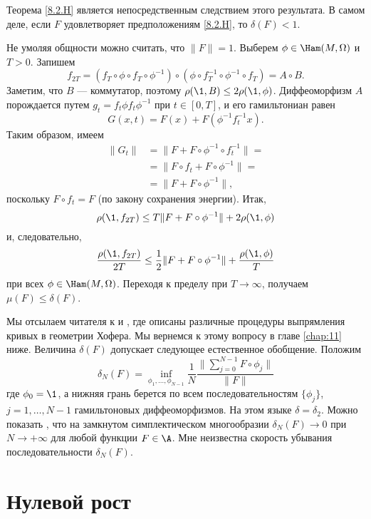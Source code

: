 Теорема \ref{8.2.H} является непосредственным следствием этого
результата. 
В самом деле, если $F$ удовлетворяет предположениям \ref{8.2.H}, то
$\delta (F) <1$. 

Не умоляя общности можно считать, что $\|F \| = 1$.
Выберем $\phi \in \Ham (M, \Omega)$ и $T> 0$.
Запишем 
\[f_{2T}= (f_T \circ \phi \circ f_T \circ \phi^{-1}) \circ (\phi \circ
f_T^{-1} \circ \phi^{-1} \circ f_T) = A \circ B.\] 
Заметим, что $B$ --- коммутатор, поэтому $\rho (\1, B) \le 2\rho (\1, \phi)$.
Диффеоморфизм $A$ порождается путем $g_t = f_t \phi f_t \phi ^{-1}$
при $t \in [0, T]$, и его гамильтониан равен  
\[G (x, t) = F (x) + F (\phi^{-1} f_t^{-1} x).\]
Таким образом, имеем 
\begin{align*}
\|G_t \| &= \|F + F \circ \phi ^{-1} \circ f_t ^{-1} \| =
\\
&=\|F \circ f_t + F \circ \phi ^{-1} \| =
\\
&=\|F + F \circ \phi ^{-1} \|,\end{align*}
поскольку $F \circ f_t = F$ (по закону сохранения энергии).
Итак, 
\[\rho (\1, f_{2T}) \le T \| F + F \circ \phi ^{-1} \| + 2\rho (\1, \phi)\]
и, следовательно, 
\[\frac{\rho (\1, f_{2T})}{2T}
\le\frac12 \|F + F \circ \phi ^{-1} \| + \frac{\rho (\1, \phi)}{T}\]
при всех $\phi \in \Ham (M , \Omega)$.
Переходя к пределу при $T \to \infty$, получаем $\mu (F) \le \delta (F)$.
\qeds

Мы отсылаем читателя к \cite{LM2} и \cite{P9}, где описаны различные
процедуры выпрямления кривых в геометрии Хофера. 
Мы вернемся к этому вопросу в главе \ref{chap:11} ниже.
Величина $\delta (F)$ допускает следующее естественное обобщение.
Положим 
\[
\delta_N(F)= \inf_{\phi_1 ,\dots, \phi_{N-1}}\frac1N \frac{\|\sum_{j
    = 0}^{N-1} F \circ \phi_j \|}{\|F \|}
\] 
где $\phi_0 = \1$, а нижняя грань берется по всем последовательностям
$\{\phi_j\}$, $j = 1,\dots, N-1 $ гамильтоновых диффеоморфизмов. 
На этом языке $\delta = \delta_2$. 
Можно показать \cite{P9}, что на замкнутом симплектическом
многообразии $\delta_N (F) \to 0$ при $N \to + \infty$ для любой
функции $F \in \A$. 
Мне неизвестна скорость убывания последовательности $\delta_N (F)$. 

\section{Нулевой рост}

